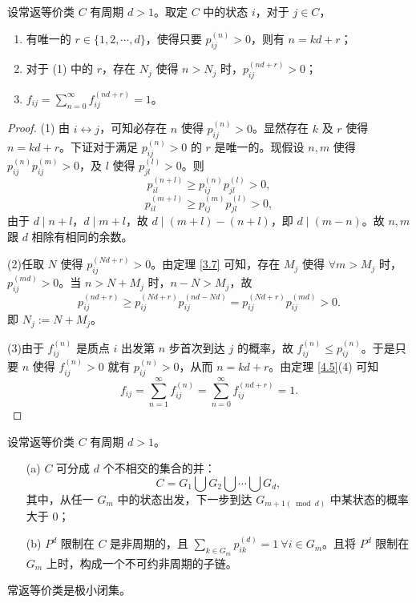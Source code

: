 \documentclass[lang=cn,10pt,thmcnt=section]{elegantbook}
\begin{document}
\begin{theorem}
	设常返等价类 \( C \) 有周期 \( d > 1 \)。取定 \( C \) 中的状态 \( i \)，对于 \( j \in C \)，
\begin{enumerate}
    \item 有唯一的 \( r \in \{1,2,\cdots,d\} \)，使得只要 \( p_{ij}^{(n)} > 0 \)，则有 \( n = kd + r \)；
    \item 对于 (1) 中的 \( r \)，存在 \( N_j \) 使得 \( n > N_j \) 时，\( p_{ij}^{(nd+r)} > 0 \)；
    \item \( f_{ij} = \sum_{n=0}^{\infty} f_{ij}^{(nd+r)} = 1 \)。
\end{enumerate}
\end{theorem}
\begin{proof}
	(1) 由 \( i \longleftrightarrow j \)，可知必存在 \( n \) 使得 \( p_{ij}^{(n)} > 0 \)。显然存在 \( k \) 及 \( r \) 使得 \( n = kd + r \)。下证对于满足 \( p_{ij}^{(n)} > 0 \) 的 \( r \) 是唯一的。现假设 \( n, m \) 使得 \( p_{ij}^{(n)} p_{ij}^{(m)} > 0 \)，及 \( l \) 使得 \( p_{jl}^{(l)} > 0 \)。则
\[
p_{il}^{(n+l)} \geq p_{ij}^{(n)} p_{jl}^{(l)} > 0,
\]
\[
p_{il}^{(m+l)} \geq p_{ij}^{(m)} p_{jl}^{(l)} > 0,
\]
由于 \( d \mid n+l \)，\( d \mid m+l \)，故 \( d \mid (m+l) - (n+l) \)，即 \( d \mid (m-n) \)。故 \( n, m \) 跟 \( d \) 相除有相同的余数。

(2)任取 \( N \) 使得 \( p_{ij}^{(Nd+r)} > 0 \)。由定理 \ref{3.7} 可知，存在 \( M_j \) 使得 \( \forall m > M_j \) 时，\( p_{ij}^{(md)} > 0 \)。当 \( n > N + M_j \) 时，\( n - N > M_j \)，故
\[
p_{ij}^{(nd+r)} \geq p_{ij}^{(Nd+r)} p_{ij}^{(nd-Nd)} = p_{ij}^{(Nd+r)} p_{ij}^{(md)} > 0.
\]
即 \( N_j := N + M_j \)。

(3)由于 \( f_{ij}^{(n)} \) 是质点 \( i \) 出发第 \( n \) 步首次到达 \( j \) 的概率，故 \( f_{ij}^{(n)} \leq p_{ij}^{(n)} \)。于是只要 \( n \) 使得 \( f_{ij}^{(n)} > 0 \) 就有 \( p_{ij}^{(n)} > 0 \)，从而 \( n = kd + r \)。由定理 \ref{4.5}(4) 可知
\[
f_{ij} = \sum_{n=1}^{\infty} f_{ij}^{(n)} = \sum_{n=0}^{\infty} f_{ij}^{(nd+r)} = 1.
\]
\end{proof}
\begin{theorem}
	设常返等价类 \( C \) 有周期 \( d > 1 \)。
\begin{enumerate}
    \item[(a)] \( C \) 可分成 \( d \) 个不相交的集合的并：
    \[
    C = G_1 \bigcup G_2 \bigcup \cdots \bigcup G_d,
    \]
    其中，从任一 \( G_m \) 中的状态出发，下一步到达 \( G_{m+1(\bmod d)} \) 中某状态的概率大于 0；
    \item[(b)] \( P^d \) 限制在 \( C \) 是非周期的，且 \( \sum_{k \in G_m} p_{ik}^{(d)} = 1 \ \forall i \in G_m \)。且将 \( P^d \) 限制在 \( G_m \) 上时，构成一个不可约非周期的子链。
\end{enumerate}
\end{theorem}
\begin{theorem}
	常返等价类是极小闭集。
\end{theorem}
\end{document}
